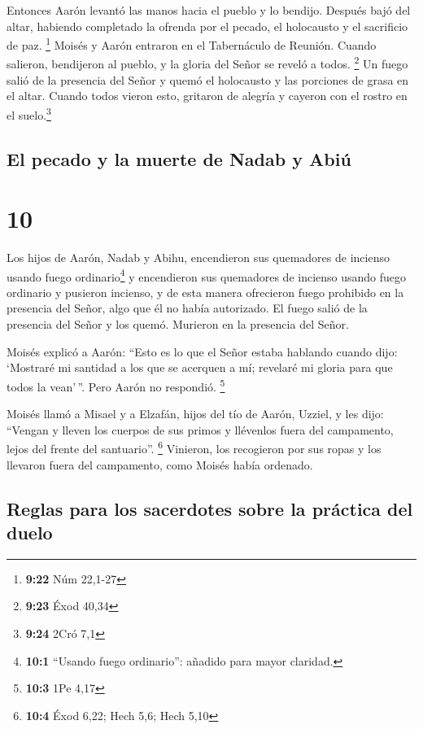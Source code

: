  Entonces Aarón levantó las manos hacia el pueblo y lo
bendijo. Después bajó del altar, habiendo completado la ofrenda por el
pecado, el holocausto y el sacrificio de paz. \footnote{\textbf{9:22}
  Núm 22,1-27}  Moisés y Aarón entraron en el Tabernáculo
de Reunión. Cuando salieron, bendijeron al pueblo, y la gloria del Señor
se reveló a todos. \footnote{\textbf{9:23} Éxod 40,34} 
Un fuego salió de la presencia del Señor y quemó el holocausto y las
porciones de grasa en el altar. Cuando todos vieron esto, gritaron de
alegría y cayeron con el rostro en el suelo.\footnote{\textbf{9:24} 2Cró
  7,1}

\hypertarget{el-pecado-y-la-muerte-de-nadab-y-abiuxfa}{%
\subsection{El pecado y la muerte de Nadab y
Abiú}\label{el-pecado-y-la-muerte-de-nadab-y-abiuxfa}}

\hypertarget{section-9}{%
\section{10}\label{section-9}}

 Los hijos de Aarón, Nadab y Abihu, encendieron sus
quemadores de incienso usando fuego ordinario\footnote{\textbf{10:1}
  ``Usando fuego ordinario'': añadido para mayor claridad.} y
encendieron sus quemadores de incienso usando fuego ordinario y pusieron
incienso, y de esta manera ofrecieron fuego prohibido en la presencia
del Señor, algo que él no había autorizado.  El fuego
salió de la presencia del Señor y los quemó. Murieron en la presencia
del Señor.

 Moisés explicó a Aarón: ``Esto es lo que el Señor estaba
hablando cuando dijo: `Mostraré mi santidad a los que se acerquen a mí;
revelaré mi gloria para que todos la vean'\,''. Pero Aarón no respondió.
\footnote{\textbf{10:3} 1Pe 4,17}

 Moisés llamó a Misael y a Elzafán, hijos del tío de
Aarón, Uzziel, y les dijo: ``Vengan y lleven los cuerpos de sus primos y
llévenlos fuera del campamento, lejos del frente del santuario''.
\footnote{\textbf{10:4} Éxod 6,22; Hech 5,6; Hech 5,10} 
Vinieron, los recogieron por sus ropas y los llevaron fuera del
campamento, como Moisés había ordenado.

\hypertarget{reglas-para-los-sacerdotes-sobre-la-pruxe1ctica-del-duelo}{%
\subsection{Reglas para los sacerdotes sobre la práctica del
duelo}\label{reglas-para-los-sacerdotes-sobre-la-pruxe1ctica-del-duelo}}

